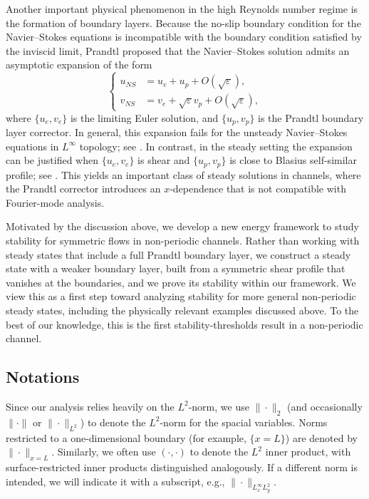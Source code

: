 \documentclass[reqno, 11pt]{amsart}
\theoremstyle{plain}
\theoremstyle{definition}
\theoremstyle{remark}
\numberwithin{equation}{section}
\begin{document}
Another important physical phenomenon in the high Reynolds number regime is the formation of boundary layers. Because the no-slip boundary condition for the Navier–Stokes equations is incompatible with the boundary condition satisfied by the inviscid limit, Prandtl proposed that the Navier–Stokes solution admits an asymptotic expansion of the form
$$\left\{
\begin{aligned}
u_{NS} &= u_e + u_p + O(\sqrt{\varepsilon}),\\
v_{NS} &= v_e + \sqrt{\varepsilon} v_p + O(\sqrt{\varepsilon}),
\end{aligned}\right.
$$
where $\{u_e,v_e\}$ is the limiting Euler solution, and $\{u_p,v_p\}$ is the Prandtl boundary layer corrector. In general, this expansion fails for the unsteady Navier–Stokes equations in $L^\infty$ topology; see \cite{Grenier-Toan19}. In contrast, in the steady setting the expansion can be justified when $\{u_e,v_e\}$ is shear and $\{u_p,v_p\}$ is close to Blasius self-similar profile; see \cites{GuoIyer23,IyerMasmoudi21a}. This yields an important class of steady solutions in channels, where the Prandtl corrector introduces an $x$-dependence that is not compatible with Fourier-mode analysis.

Motivated by the discussion above, we develop a new energy framework to study stability for symmetric flows in non-periodic channels. Rather than working with steady states that include a full Prandtl boundary layer, we construct a steady state with a weaker boundary layer, built from a symmetric shear profile that vanishes at the boundaries, and we prove its stability within our framework. We view this as a first step toward analyzing stability for more general non-periodic steady states, including the physically relevant examples discussed above. To the best of our knowledge, this is the first stability-thresholds result in a non-periodic channel.


\subsection{Notations}

Since our analysis relies heavily on the $L^2$-norm, we use $\| \cdot \|_2$ (and occasionally $\| \cdot \|$ or $\| \cdot \|_{L^2}$) to denote the $L^2$-norm for the spacial variables. Norms restricted to a one-dimensional boundary (for example, $\{x = L\}$) are denoted by  $\| \cdot \|_{x=L}$. Similarly, we often use $(\cdot, \cdot)$ to denote the $L^2$ inner product, with surface-restricted inner products distinguished analogously. If a different norm is intended, we will indicate it with a subscript, e.g., $\| \cdot \|_{L^\infty_x L^2_y}$.
\end{document}
